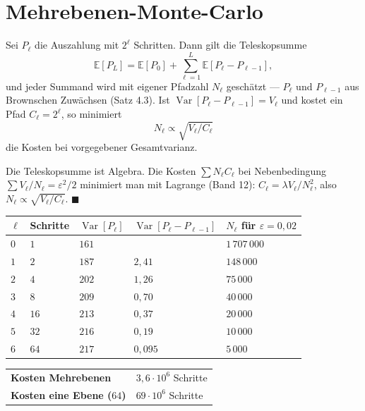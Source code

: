 \section{Mehrebenen-Monte-Carlo}

\begin{merksatz}
Sei $P_\ell$ die Auszahlung mit $2^\ell$ Schritten. Dann gilt die Teleskopsumme
\[ \mathbb E[P_L] = \mathbb E[P_0] + \sum_{\ell=1}^{L}\mathbb E[P_\ell - P_{\ell-1}] , \]
und jeder Summand wird mit eigener Pfadzahl $N_\ell$ geschätzt --- $P_\ell$ und $P_{\ell-1}$ aus  Brownschen Zuwächsen (Satz 4.3). Ist $\operatorname{Var}[P_\ell - P_{\ell-1}] = V_\ell$ und kostet ein Pfad $C_\ell = 2^\ell$, so minimiert
\[ N_\ell \propto \sqrt{V_\ell/C_\ell} \]
die Kosten bei vorgegebener Gesamtvarianz.

Die Teleskopsumme ist Algebra. Die Kosten $\sum N_\ell C_\ell$ bei Nebenbedingung $\sum V_\ell/N_\ell = \varepsilon^2/2$ minimiert man mit Lagrange (Band 12): $C_\ell = \lambda V_\ell/N_\ell^2$, also $N_\ell \propto \sqrt{V_\ell/C_\ell}$. $\blacksquare$

\begin{center}
{\small
\renewcommand{\arraystretch}{1.48}
\begin{tabular}{@{}P{1.2cm}P{1.6cm}P{2.0cm}P{2.6cm}P{2.0cm}@{}}
\toprule
$\ell$ & \textbf{Schritte} & $\operatorname{Var}[P_\ell]$ & $\operatorname{Var}[P_\ell - P_{\ell-1}]$ & $N_\ell$ für $\varepsilon = 0{,}02$\\
\midrule
$0$ & $1$ & $161$ & & $1\,707\,000$\\
$1$ & $2$ & $187$ & $2{,}41$ & $148\,000$\\
$2$ & $4$ & $202$ & $1{,}26$ & $75\,000$\\
$3$ & $8$ & $209$ & $0{,}70$ & $40\,000$\\
$4$ & $16$ & $213$ & $0{,}37$ & $20\,000$\\
$5$ & $32$ & $216$ & $0{,}19$ & $10\,000$\\
$6$ & $64$ & $217$ & $0{,}095$ & $5\,000$\\
\bottomrule
\end{tabular}}
\end{center}

\begin{center}
{\small
\renewcommand{\arraystretch}{1.48}
\begin{tabular}{@{}P{4.0cm}P{3.4cm}@{}}
\toprule
\textbf{Kosten Mehrebenen} & $3{,}6\cdot10^{6}$ Schritte\\
\textbf{Kosten eine Ebene ($64$)} & $69\cdot10^{6}$ Schritte\\
\bottomrule
\end{tabular}}
\end{center}


\end{merksatz}

